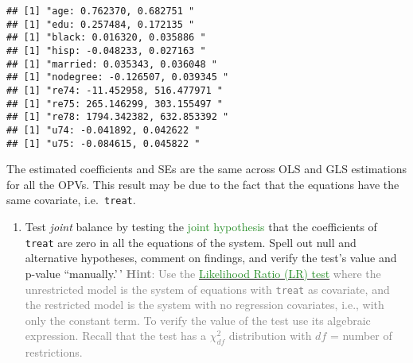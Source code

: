 \documentclass[
]{article}
\providecommand{\tightlist}{%
  \setlength{\itemsep}{0pt}\setlength{\parskip}{0pt}}
\begin{document}
\begin{verbatim}
## [1] "age: 0.762370, 0.682751 "
## [1] "edu: 0.257484, 0.172135 "
## [1] "black: 0.016320, 0.035886 "
## [1] "hisp: -0.048233, 0.027163 "
## [1] "married: 0.035343, 0.036048 "
## [1] "nodegree: -0.126507, 0.039345 "
## [1] "re74: -11.452958, 516.477971 "
## [1] "re75: 265.146299, 303.155497 "
## [1] "re78: 1794.342382, 632.853392 "
## [1] "u74: -0.041892, 0.042622 "
## [1] "u75: -0.084615, 0.045822 "
\end{verbatim}

The estimated coefficients and SEs are the same across OLS and GLS
estimations for all the OPVs. This result may be due to the fact that
the equations have the same covariate, i.e.~\texttt{treat}.

\begin{enumerate}
\def\labelenumi{\alph{enumi}.}
\setcounter{enumi}{1}
\tightlist
\item
  Test \textit{joint} balance by testing the
  \textcolor{ForestGreen}{joint hypothesis} that the coefficients of
  \texttt{treat} are zero in all the equations of the system. Spell out
  null and alternative hypotheses, comment on findings, and verify the
  test's value and p-value ``manually.'\,'
  \textcolor{gray}{\textbf{Hint}: Use the \href{https://en.wikipedia.org/wiki/Likelihood-ratio_test}{\textcolor{ForestGreen}{Likelihood Ratio (LR) test}} where the unrestricted model is the system of equations with \texttt{treat} as covariate, and the restricted model is the system with no regression covariates, i.e., with only the constant term. To verify the value of the test use its algebraic expression. Recall that the test has a $\chi^{2}_{df}$ distribution with $df$ = number of restrictions.}
\end{enumerate}
\end{document}
